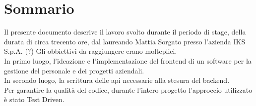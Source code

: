 
\cleardoublepage
{}
{}
\begingroup
\let\clearpage\relax
\let\cleardoublepage\relax
\let\cleardoublepage\relax

\chapter*{Sommario}

Il presente documento descrive il lavoro svolto durante il periodo di stage, della durata di circa trecento ore, dal laureando Mattia Sorgato presso l'azienda IKS S.p.A. (?)
Gli obbiettivi da raggiungere erano molteplici.\\
In primo luogo, l'ideazione e l'implementazione del frontend di un software per la gestione del personale e dei progetti aziendali.\\
In secondo luogo, la scrittura delle \gls{api} necessarie alla stesura del backend.\\
Per garantire la qualità del codice, durante l'intero progetto l'approccio utilizzato è stato Test Driven.

%
%

\endgroup			

\vfill

